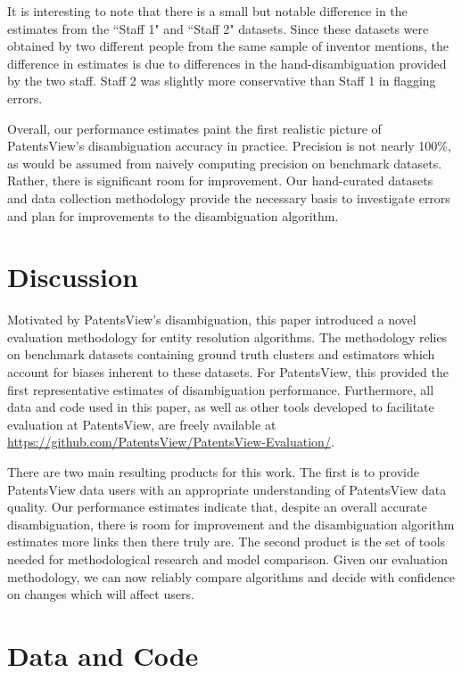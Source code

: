 \documentclass[fontsize=11pt]{article}
\theoremstyle{definition}
\begin{document}
It is interesting to note that there is a small but notable difference in the estimates from the ``Staff 1" and ``Staff 2" datasets. Since these datasets were obtained by two different people from the same sample of inventor mentions, the difference in estimates is due to differences in the hand-disambiguation provided by the two staff. Staff 2 was slightly more conservative than Staff 1 in flagging errors.

Overall, our performance estimates paint the first realistic picture of PatentsView's disambiguation accuracy in practice. Precision is not nearly 100\%, as would be assumed from naively computing precision on benchmark datasets. Rather, there is significant room for improvement. Our hand-curated datasets and data collection methodology provide the necessary basis to investigate errors and plan for improvements to the disambiguation algorithm. 

\section{Discussion}\label{sec:discussion}

Motivated by PatentsView's disambiguation, this paper introduced a novel evaluation methodology for entity resolution algorithms. The methodology relies on benchmark datasets containing ground truth clusters and estimators which account for biases inherent to these datasets. For PatentsView, this provided the first representative estimates of disambiguation performance. Furthermore, all data and code used in this paper, as well as other tools developed to facilitate evaluation at PatentsView, are freely available at \hyperref[https://github.com/PatentsView/PatentsView-Evaluation/]{https://github.com/PatentsView/PatentsView-Evaluation/}.

There are two main resulting products for this work. The first is to provide PatentsView data users with an appropriate understanding of PatentsView data quality. Our performance estimates indicate that, despite an overall accurate disambiguation, there is room for improvement and the disambiguation algorithm estimates more links then there truly are. The second product is the set of tools needed for methodological research and model comparison. Given our evaluation methodology, we can now reliably compare algorithms and decide with confidence on changes which will affect users.




\section*{Data and Code}
\end{document}

